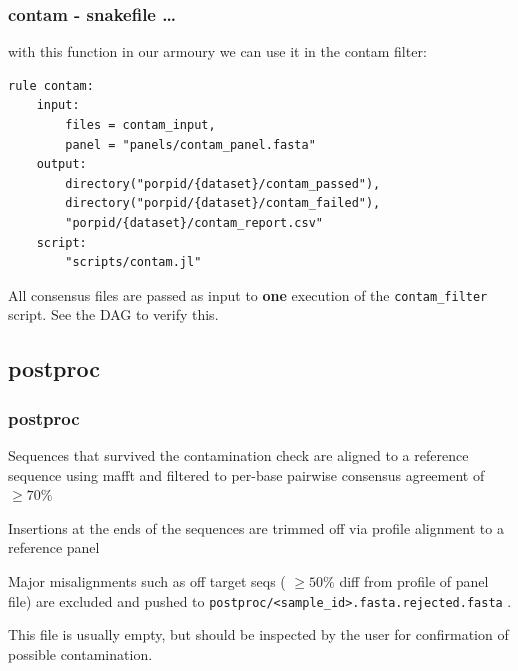 \documentclass{beamer}
\begin{document}
\begin{frame}[fragile]
\frametitle{contam - snakefile \ldots }

\alert<1> 

with this function in our armoury we can use it in the contam filter:

\begin{tiny}
\begin{verbatim}
rule contam:
    input:
        files = contam_input,
        panel = "panels/contam_panel.fasta"
    output:
        directory("porpid/{dataset}/contam_passed"),
        directory("porpid/{dataset}/contam_failed"),
        "porpid/{dataset}/contam_report.csv"
    script:
        "scripts/contam.jl"
\end{verbatim}
\end{tiny}

All consensus files are passed as input to {\bf one} execution of the 
{\tt contam\_filter} script. See the DAG to verify this.
 

\end{frame}




\subsection{postproc}

\begin{frame}[fragile]
\frametitle{postproc }

\alert<1> 

Sequences that survived the contamination check are aligned to a reference sequence using mafft
and  filtered to per-base pairwise consensus agreement of $ \geq 70\% $

\bigskip
Insertions at the ends of the sequences are trimmed off via profile alignment to a reference panel

\bigskip
Major misalignments such as off target seqs ( $\geq 50\%$  diff from profile of panel file) are excluded 
and pushed to {\tt postproc/<sample\_id>.fasta.rejected.fasta} . 

\bigskip
This file is usually empty, but should be inspected by the user for confirmation of possible contamination.

\end{frame}
\end{document}

